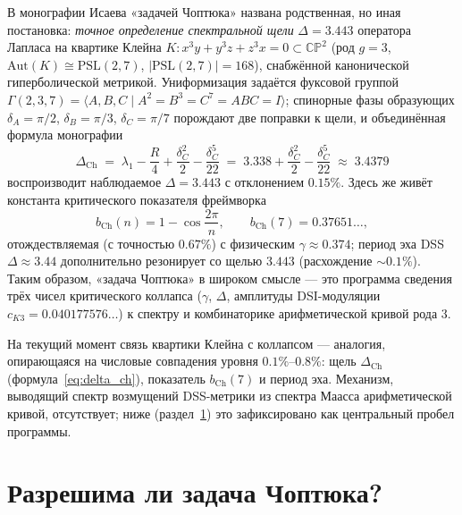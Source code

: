 \documentclass[11pt,a4paper]{article}
\theoremstyle{definition}
\theoremstyle{remark}
\begin{document}
В монографии Исаева «задачей Чоптюка» названа родственная, но иная постановка:
\emph{точное определение спектральной щели} $\Delta = 3.443$ оператора Лапласа
на квартике Клейна
$K\colon x^3y + y^3z + z^3x = 0 \subset \mathbb{CP}^2$ (род $g = 3$,
$\mathrm{Aut}(K) \cong \mathrm{PSL}(2,7)$, $|\mathrm{PSL}(2,7)| = 168$),
снабжённой канонической гиперболической метрикой. Униформизация задаётся
фуксовой группой $\Gamma(2,3,7) = \langle A,B,C \mid A^2 = B^3 = C^7 = ABC = I
\rangle$; спинорные фазы образующих $\delta_A = \pi/2$, $\delta_B = \pi/3$,
$\delta_C = \pi/7$ порождают две поправки к щели, и объединённая формула
монографии
\begin{equation}\label{eq:delta_ch}
\Delta_{\mathrm{Ch}} \;=\; \lambda_1 - \frac{R}{4} + \frac{\delta_C^2}{2}
- \frac{\delta_C^5}{22} \;=\; 3.338 + \frac{\delta_C^2}{2} - \frac{\delta_C^5}{22}
\;\approx\; 3.4379
\end{equation}
воспроизводит наблюдаемое $\Delta = 3.443$ с отклонением $0.15\%$. Здесь же
живёт константа критического показателя фреймворка
\begin{equation}\label{eq:bch}
b_{\mathrm{Ch}}(n) = 1 - \cos\frac{2\pi}{n},
\qquad b_{\mathrm{Ch}}(7) = 0.37651\ldots,
\end{equation}
отождествляемая (с точностью $0.67\%$) с физическим $\gamma \approx 0.374$;
период эха DSS $\Delta \approx 3.44$ дополнительно резонирует со щелью
$3.443$ (расхождение $\sim 0.1\%$). Таким образом, «задача Чоптюка» в широком
смысле --- это программа сведения трёх чисел критического коллапса
($\gamma$, $\Delta$, амплитуды DSI-модуляции $c_{K3} = 0.040177576\ldots$)
к спектру и комбинаторике арифметической кривой рода 3.

\begin{honestybox}
На текущий момент связь квартики Клейна с коллапсом --- аналогия, опирающаяся
на числовые совпадения уровня $0.1\%$--$0.8\%$: щель $\Delta_{\mathrm{Ch}}$
(формула~\eqref{eq:delta_ch}), показатель $b_{\mathrm{Ch}}(7)$ и период эха.
Механизм, выводящий спектр возмущений DSS-метрики из спектра Маасса
арифметической кривой, отсутствует; ниже (раздел~\ref{sec:solvability}) это
зафиксировано как центральный пробел программы.
\end{honestybox}

\section{Разрешима ли задача Чоптюка?}\label{sec:solvability}
\end{document}
